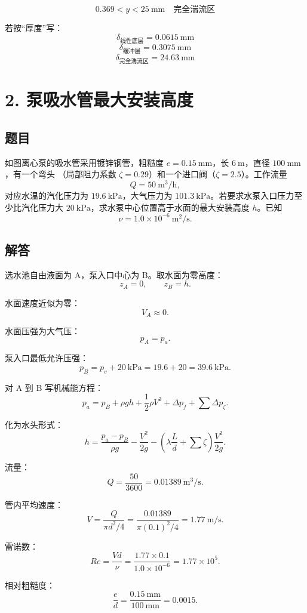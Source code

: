 \documentclass[11pt,a4paper]{ctexart}
\begin{document}
\[
\boxed{0.369<y<25\ \mathrm{mm}\quad\text{完全湍流区}}
\]

若按“厚度”写：
\[
\boxed{\delta_{\text{线性底层}}=0.0615\ \mathrm{mm}}
\]
\[
\boxed{\delta_{\text{缓冲层}}=0.3075\ \mathrm{mm}}
\]
\[
\boxed{\delta_{\text{完全湍流区}}=24.63\ \mathrm{mm}}
\]

\section*{2. 泵吸水管最大安装高度}

\subsection*{题目}

如图离心泵的吸水管采用镀锌钢管，粗糙度 \(e=0.15\ \mathrm{mm}\)，长 \(6\ \mathrm{m}\)，直径 \(100\ \mathrm{mm}\)，有一个弯头
（局部阻力系数 \(\zeta=0.29\)）和一个进口阀（\(\zeta=2.5\)）。工作流量
\[
Q=50\ \mathrm{m^3/h},
\]
对应水温的汽化压力为 \(19.6\ \mathrm{kPa}\)，大气压力为 \(101.3\ \mathrm{kPa}\)。若要求水泵入口压力至少比汽化压力大 \(20\ \mathrm{kPa}\)，求水泵中心位置高于水面的最大安装高度 \(h\)。已知
\[
\nu=1.0\times10^{-6}\ \mathrm{m^2/s}.
\]

\subsection*{解答}

选水池自由液面为 A，泵入口中心为 B。取水面为零高度：
\[
z_A=0,\qquad z_B=h.
\]

水面速度近似为零：
\[
V_A\approx0.
\]

水面压强为大气压：
\[
p_A=p_a.
\]

泵入口最低允许压强：
\[
p_B=p_v+20\ \mathrm{kPa}=19.6+20=39.6\ \mathrm{kPa}.
\]

对 A 到 B 写机械能方程：
\[
p_a=p_B+\rho gh+\frac12\rho V^2+\Delta p_f+\sum\Delta p_\zeta.
\]

化为水头形式：
\[
h=\frac{p_a-p_B}{\rho g}
-\frac{V^2}{2g}
-\left(\lambda\frac{L}{d}+\sum\zeta\right)\frac{V^2}{2g}.
\]

流量：
\[
Q=\frac{50}{3600}=0.01389\ \mathrm{m^3/s}.
\]

管内平均速度：
\[
V=\frac{Q}{\pi d^2/4}
=\frac{0.01389}{\pi(0.1)^2/4}
=1.77\ \mathrm{m/s}.
\]

雷诺数：
\[
Re=\frac{Vd}{\nu}
=\frac{1.77\times0.1}{1.0\times10^{-6}}
=1.77\times10^5.
\]

相对粗糙度：
\[
\frac{e}{d}=\frac{0.15\ \mathrm{mm}}{100\ \mathrm{mm}}=0.0015.
\]
\end{document}
